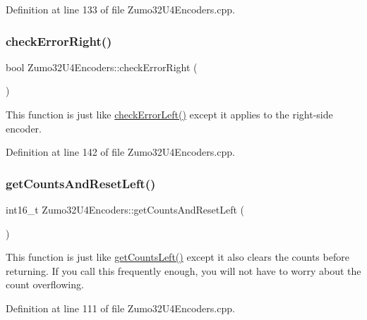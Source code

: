 Definition at line 133 of file Zumo32\+U4\+Encoders.\+cpp.

\mbox{\label{class_zumo32_u4_encoders_a9d7de11def7409becbe870056ef2d719}} 
\subsubsection{\texorpdfstring{check\+Error\+Right()}{checkErrorRight()}}
{\footnotesize\ttfamily bool Zumo32\+U4\+Encoders\+::check\+Error\+Right (\begin{DoxyParamCaption}{ }\end{DoxyParamCaption})\hspace{0.3cm}{\ttfamily [static]}}

This function is just like \hyperlink{class_zumo32_u4_encoders_ad20765947ef87f562a4a19975a7fb9ca}{check\+Error\+Left()} except it applies to the right-\/side encoder. 

Definition at line 142 of file Zumo32\+U4\+Encoders.\+cpp.

\mbox{\label{class_zumo32_u4_encoders_a9b212103e652d1edb9d622381c303497}} 
\subsubsection{\texorpdfstring{get\+Counts\+And\+Reset\+Left()}{getCountsAndResetLeft()}}
{\footnotesize\ttfamily int16\+\_\+t Zumo32\+U4\+Encoders\+::get\+Counts\+And\+Reset\+Left (\begin{DoxyParamCaption}{ }\end{DoxyParamCaption})\hspace{0.3cm}{\ttfamily [static]}}

This function is just like \hyperlink{class_zumo32_u4_encoders_a142d33610a12b209e257c1635b2daae6}{get\+Counts\+Left()} except it also clears the counts before returning. If you call this frequently enough, you will not have to worry about the count overflowing. 

Definition at line 111 of file Zumo32\+U4\+Encoders.\+cpp.

